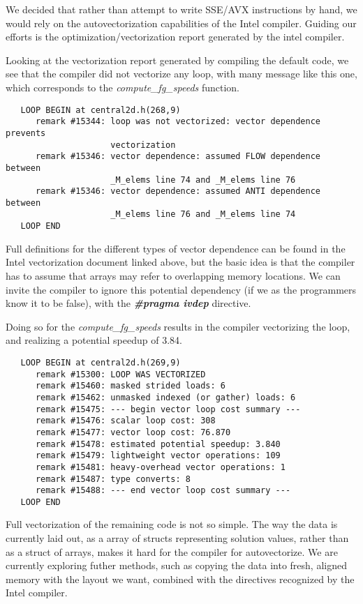We decided that rather than attempt to write SSE/AVX instructions by hand, we 
would rely on the autovectorization capabilities of the Intel compiler.
Guiding our efforts is the optimization/vectorization report generated by the intel
compiler.

Looking at the vectorization report generated by compiling the default code, we see
that the compiler did not vectorize any loop, with many message like this one, which
corresponds to the \emph{compute\_fg\_speeds} function.

\begin{lstlisting}
   LOOP BEGIN at central2d.h(268,9)
      remark #15344: loop was not vectorized: vector dependence prevents 
                     vectorization
      remark #15346: vector dependence: assumed FLOW dependence between 
                     _M_elems line 74 and _M_elems line 76
      remark #15346: vector dependence: assumed ANTI dependence between 
                     _M_elems line 76 and _M_elems line 74
   LOOP END
\end{lstlisting}

Full definitions for the different types of vector dependence can be found in the 
Intel vectorization document linked above,
but the basic idea is that the compiler has to assume that arrays may refer to
overlapping memory locations.  We can invite the compiler to ignore this potential
dependency (if we as the programmers know it to be false), with the
\textbf{\emph{\#pragma ivdep}} directive.

Doing so for the \emph{compute\_fg\_speeds} results in the compiler
vectorizing the loop, and realizing a potential speedup of 3.84.

\begin{lstlisting}
   LOOP BEGIN at central2d.h(269,9)
      remark #15300: LOOP WAS VECTORIZED
      remark #15460: masked strided loads: 6 
      remark #15462: unmasked indexed (or gather) loads: 6 
      remark #15475: --- begin vector loop cost summary ---
      remark #15476: scalar loop cost: 308 
      remark #15477: vector loop cost: 76.870 
      remark #15478: estimated potential speedup: 3.840 
      remark #15479: lightweight vector operations: 109 
      remark #15481: heavy-overhead vector operations: 1 
      remark #15487: type converts: 8 
      remark #15488: --- end vector loop cost summary ---
   LOOP END
\end{lstlisting}

Full vectorization of the remaining code is not so simple.  The way the data is 
currently laid out, as a array of structs representing solution values, rather
than as a struct of arrays, makes it hard for the compiler for autovectorize.
We are currently exploring futher methods, such as copying the data into fresh,
aligned memory with the layout we want, combined with the directives recognized
by the Intel compiler.


